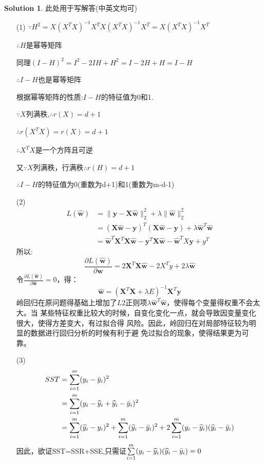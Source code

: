 \documentclass[a4paper,UTF8]{article}
\numberwithin{equation}{section}
\theoremstyle{definition}
\newtheorem*{solution}{Solution}
\def \X {\mathbf{X}}
\def \w {\hat{\boldsymbol{w}}}
\def \y {\mathbf{y}}
\def \hy {\widehat{y}}
\def \by {\Bar{y}}
\begin{document}
	
	\begin{solution}
		此处用于写解答(中英文均可)
		\begin{enumerate}
			\item[(1)]
				$\because H^2=X(X^{T}X)^{-1}X^{T}X(X^{T}X)^{-1}X^{T}=X(X^{T}X)^{-1}X^{T}$

				$\therefore H$是幂等矩阵

				同理$(I-H)^2=I^{2}-2IH+H^{2}=I-2H+H=I-H$

				$\therefore I-H$也是幂等矩阵

				根据幂等矩阵的性质:$I-H$的特征值为0和1.

				$\because X$列满秩,$\therefore r(X)=d+1$

				$\therefore r(X^{T}X)=r(X)=d+1$

				$\therefore X^{T}X$是一个方阵且可逆

				又$\because X$列满秩，行满秩$\therefore r(H)=d+1$

				$\therefore I-H$的特征值为0(重数为d+1)和1(重数为m-d-1)
			\item[(2)] 
				\begin{equation}
					\begin{aligned}
						L(\w) &= \lVert \y - \X \w \rVert_2^2 +\lambda \lVert \w \rVert_2^2\\
										&= (\X\w-\y)^{T}(\X\w-\y) + \lambda \w^{T}\w \\
										&= \w^{T}\X^{T}\X\w-\y^{T}\X\w-\w^{T}X\y+y^{T}
					\end{aligned}
				\end{equation}
				所以:
				\begin{equation}
					\frac{\partial L(\w)}{\partial \w} = 2\X^{T}\X\w-2X^{T}y+2\lambda\w
				\end{equation}
				令$\frac{\partial L(\w)}{\partial \w}=0$，得：
				\begin{equation}
						\w=(\X^{T}\X+\lambda E)^{-1}\X^{T}\y 	
				\end{equation}
				岭回归在原问题得基础上增加了$L2$正则项$\lambda \w^{T}\w$，使得每个变量得权重不会太大。当
				某些特征权重比较大的时候，自变化变化一点，就会导致因变量变化很大，使得方差变大，有过拟合得
				风险。因此，岭回归在对局部特征较为明显的数据进行回归分析的时候有利于避
				免过拟合的现象，使得结果更为可靠。
			\item[(3)] 
				\begin{equation}
					\begin{aligned}
						SST &= \sum\limits_{i=1}^{m}(y_i-\by_i)^2 \\
							&= \sum\limits_{i=1}^{m}(y_i-\hy_i+\hy_i-\by_i)^2 \\
							&= \sum\limits_{i=1}^{m}(\hy_i-y_i)^2 + \sum\limits_{i=1}^{m}(\hy_i-\by_i)^2+2\sum\limits_{i=1}^{m}(y_i-\hy_i)(\hy_i-\by_i) \\
					\end{aligned}
				\end{equation}
				因此，欲证SST=SSR+SSE,只需证$\sum\limits_{i=1}^{m}(y_i-\hy_i)(\hy_i-\by_i)=0$
				

\end{enumerate}
\end{solution}
\end{document}
